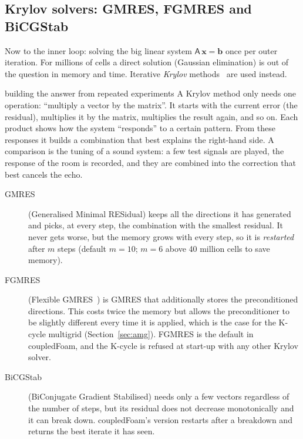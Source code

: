 \documentclass[11pt,a4paper]{article}
\newcommand{\vect}[1]{\mathbf{#1}}
\begin{document}
\subsection{Krylov solvers: GMRES, FGMRES and BiCGStab}\label{sec:krylov}

Now to the inner loop: solving the big linear system $\mathsf A\,\vect x=\vect b$
once per outer iteration. For millions of cells a direct solution
(Gaussian elimination) is out of the question in memory and time. Iterative
\emph{Krylov} methods~\cite{Saad2003} are used instead.

\begin{intuition}{building the answer from repeated experiments}
  A Krylov method only needs one operation: ``multiply a vector by the
  matrix''. It starts with the current error (the residual), multiplies it
  by the matrix, multiplies the result again, and so on. Each product shows
  how the system ``responds'' to a certain pattern. From these responses it
  builds a combination that best explains the right-hand side. A
  comparison is the tuning of a sound system: a few test signals are played, the response of
  the room is recorded, and they are combined into the correction that best
  cancels the echo.
\end{intuition}

\begin{description}
\item[GMRES] (Generalised Minimal RESidual) keeps all the directions it has
  generated and picks, at every step, the combination with the smallest
  residual. It never gets worse, but the memory grows with every step, so
  it is \emph{restarted} after $m$ steps (default $m=10$; $m=6$ above 40
  million cells to save memory).
\item[FGMRES] (Flexible GMRES~\cite{Saad1993}) is GMRES that additionally
  stores the preconditioned directions. This costs twice the memory but
  allows the preconditioner to be slightly different every time it is
  applied, which is the case for the K-cycle multigrid
  (Section~\ref{sec:amg}). FGMRES is the default in coupledFoam, and the
  K-cycle is refused at start-up with any other Krylov solver.
\item[BiCGStab] (BiConjugate Gradient Stabilised) needs only a few vectors
  regardless of the number of steps, but its residual does not decrease
  monotonically and it can break down. coupledFoam's version restarts
  after a breakdown and returns the best iterate it has seen.
\end{description}
\end{document}
